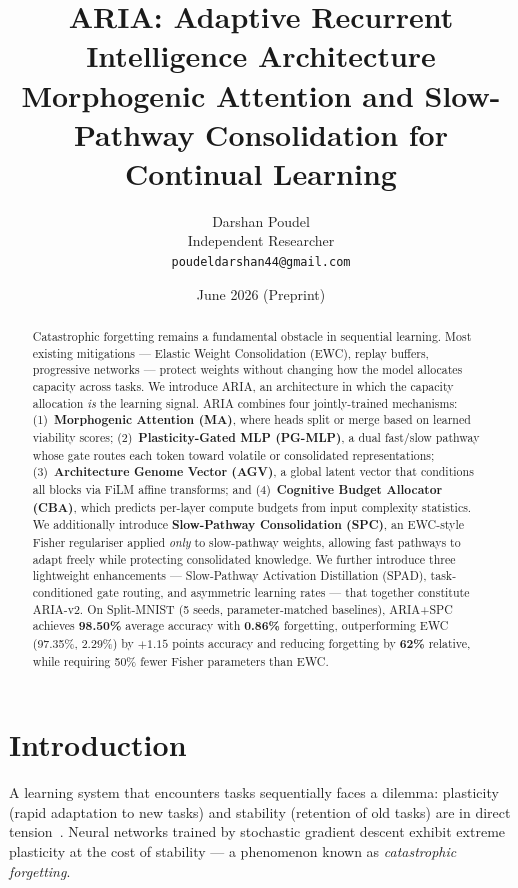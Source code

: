 \documentclass[10pt,twocolumn]{article}
\title{\textbf{ARIA: Adaptive Recurrent Intelligence Architecture}\\
\large Morphogenic Attention and Slow-Pathway Consolidation for Continual Learning}
\author{
  Darshan Poudel\\
  Independent Researcher\\
  \texttt{poudeldarshan44@gmail.com}
}
\date{June 2026 \quad (Preprint)}
\begin{document}
\maketitle

\begin{abstract}

Catastrophic forgetting remains a fundamental obstacle in sequential learning.
Most existing mitigations --- Elastic Weight Consolidation (EWC), replay buffers,
progressive networks --- protect weights without changing how the model allocates
capacity across tasks. We introduce ARIA, an architecture in which the capacity
allocation \emph{is} the learning signal. ARIA combines four jointly-trained
mechanisms: (1)~\textbf{Morphogenic Attention (MA)}, where heads split or merge
based on learned viability scores; (2)~\textbf{Plasticity-Gated MLP (PG-MLP)},
a dual fast/slow pathway whose gate routes each token toward volatile or consolidated
representations; (3)~\textbf{Architecture Genome Vector (AGV)}, a global latent
vector that conditions all blocks via FiLM affine transforms; and
(4)~\textbf{Cognitive Budget Allocator (CBA)}, which predicts per-layer compute
budgets from input complexity statistics. We additionally introduce
\textbf{Slow-Pathway Consolidation (SPC)}, an EWC-style Fisher regulariser applied
\emph{only} to slow-pathway weights, allowing fast pathways to adapt freely while
protecting consolidated knowledge. We further introduce three lightweight enhancements --- Slow-Pathway Activation
Distillation (SPAD), task-conditioned gate routing, and asymmetric learning rates ---
that together constitute ARIA-v2. On Split-MNIST (5 seeds, parameter-matched baselines),
ARIA+SPC achieves \textbf{98.50\%} average accuracy with \textbf{0.86\%} forgetting,
outperforming EWC (97.35\%, 2.29\%) by $+1.15$ points accuracy and reducing forgetting
by \textbf{62\%} relative, while requiring 50\% fewer Fisher parameters than EWC.

\end{abstract}

\section{Introduction}
\label{sec:intro}

A learning system that encounters tasks sequentially faces a dilemma: plasticity
(rapid adaptation to new tasks) and stability (retention of old tasks) are in direct
tension~\citep{mccloskey1989catastrophic,french1999catastrophic}. Neural networks
trained by stochastic gradient descent exhibit extreme plasticity at the cost of
stability --- a phenomenon known as \emph{catastrophic forgetting}.
\end{document}
